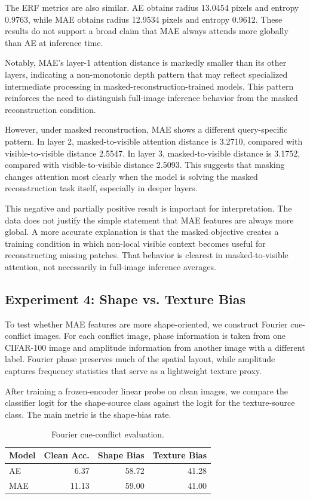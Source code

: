 \documentclass[10pt,twocolumn,letterpaper]{article}
\begin{document}
The ERF metrics are also similar. AE obtains radius 13.0454 pixels and entropy 0.9763, while MAE obtains radius 12.9534 pixels and entropy 0.9612. These results do not support a broad claim that MAE always attends more globally than AE at inference time.

Notably, MAE's layer-1 attention distance is markedly smaller than its other layers, indicating a non-monotonic depth pattern that may reflect specialized intermediate processing in masked-reconstruction-trained models. This pattern reinforces the need to distinguish full-image inference behavior from the masked reconstruction condition.

However, under masked reconstruction, MAE shows a different query-specific pattern. In layer 2, masked-to-visible attention distance is 3.2710, compared with visible-to-visible distance 2.5547. In layer 3, masked-to-visible distance is 3.1752, compared with visible-to-visible distance 2.5093. This suggests that masking changes attention most clearly when the model is solving the masked reconstruction task itself, especially in deeper layers.

This negative and partially positive result is important for interpretation. The data does not justify the simple statement that MAE features are always more global. A more accurate explanation is that the masked objective creates a training condition in which non-local visible context becomes useful for reconstructing missing patches. That behavior is clearest in masked-to-visible attention, not necessarily in full-image inference averages.

\subsection{Experiment 4: Shape vs. Texture Bias}

To test whether MAE features are more shape-oriented, we construct Fourier cue-conflict images. For each conflict image, phase information is taken from one CIFAR-100 image and amplitude information from another image with a different label. Fourier phase preserves much of the spatial layout, while amplitude captures frequency statistics that serve as a lightweight texture proxy.

After training a frozen-encoder linear probe on clean images, we compare the classifier logit for the shape-source class against the logit for the texture-source class. The main metric is the shape-bias rate.

\begin{table}[t]
\centering
\caption{Fourier cue-conflict evaluation.}
\label{tab:exp4}
\begin{tabular}{lrrr}
\toprule
Model & Clean Acc. & Shape Bias & Texture Bias \\
\midrule
AE  & 6.37 & 58.72 & 41.28 \\
MAE & 11.13 & 59.00 & 41.00 \\
\bottomrule
\end{tabular}
\end{table}
\end{document}
